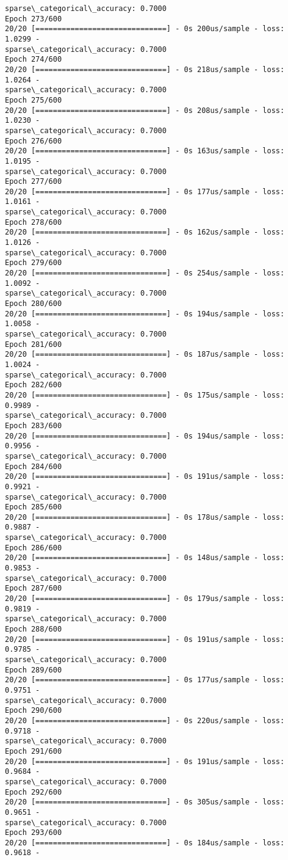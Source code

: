 \documentclass[11pt]{article}
\begin{document}
\begin{Verbatim}[commandchars=\\\{\}]
sparse\_categorical\_accuracy: 0.7000
Epoch 273/600
20/20 [==============================] - 0s 200us/sample - loss: 1.0299 -
sparse\_categorical\_accuracy: 0.7000
Epoch 274/600
20/20 [==============================] - 0s 218us/sample - loss: 1.0264 -
sparse\_categorical\_accuracy: 0.7000
Epoch 275/600
20/20 [==============================] - 0s 208us/sample - loss: 1.0230 -
sparse\_categorical\_accuracy: 0.7000
Epoch 276/600
20/20 [==============================] - 0s 163us/sample - loss: 1.0195 -
sparse\_categorical\_accuracy: 0.7000
Epoch 277/600
20/20 [==============================] - 0s 177us/sample - loss: 1.0161 -
sparse\_categorical\_accuracy: 0.7000
Epoch 278/600
20/20 [==============================] - 0s 162us/sample - loss: 1.0126 -
sparse\_categorical\_accuracy: 0.7000
Epoch 279/600
20/20 [==============================] - 0s 254us/sample - loss: 1.0092 -
sparse\_categorical\_accuracy: 0.7000
Epoch 280/600
20/20 [==============================] - 0s 194us/sample - loss: 1.0058 -
sparse\_categorical\_accuracy: 0.7000
Epoch 281/600
20/20 [==============================] - 0s 187us/sample - loss: 1.0024 -
sparse\_categorical\_accuracy: 0.7000
Epoch 282/600
20/20 [==============================] - 0s 175us/sample - loss: 0.9989 -
sparse\_categorical\_accuracy: 0.7000
Epoch 283/600
20/20 [==============================] - 0s 194us/sample - loss: 0.9956 -
sparse\_categorical\_accuracy: 0.7000
Epoch 284/600
20/20 [==============================] - 0s 191us/sample - loss: 0.9921 -
sparse\_categorical\_accuracy: 0.7000
Epoch 285/600
20/20 [==============================] - 0s 178us/sample - loss: 0.9887 -
sparse\_categorical\_accuracy: 0.7000
Epoch 286/600
20/20 [==============================] - 0s 148us/sample - loss: 0.9853 -
sparse\_categorical\_accuracy: 0.7000
Epoch 287/600
20/20 [==============================] - 0s 179us/sample - loss: 0.9819 -
sparse\_categorical\_accuracy: 0.7000
Epoch 288/600
20/20 [==============================] - 0s 191us/sample - loss: 0.9785 -
sparse\_categorical\_accuracy: 0.7000
Epoch 289/600
20/20 [==============================] - 0s 177us/sample - loss: 0.9751 -
sparse\_categorical\_accuracy: 0.7000
Epoch 290/600
20/20 [==============================] - 0s 220us/sample - loss: 0.9718 -
sparse\_categorical\_accuracy: 0.7000
Epoch 291/600
20/20 [==============================] - 0s 191us/sample - loss: 0.9684 -
sparse\_categorical\_accuracy: 0.7000
Epoch 292/600
20/20 [==============================] - 0s 305us/sample - loss: 0.9651 -
sparse\_categorical\_accuracy: 0.7000
Epoch 293/600
20/20 [==============================] - 0s 184us/sample - loss: 0.9618 -

\end{Verbatim}
\end{document}
